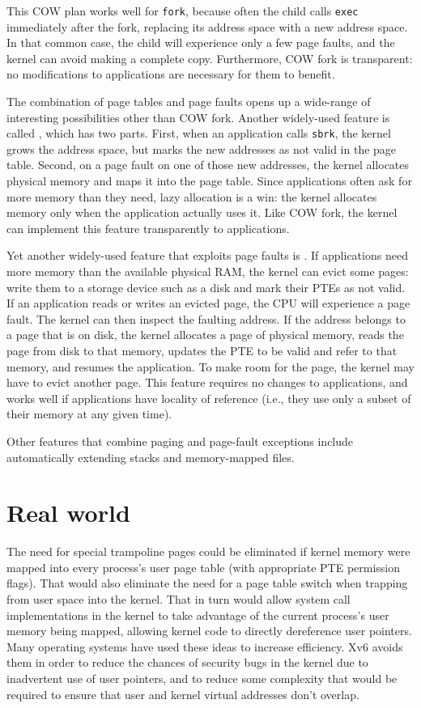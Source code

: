 This COW plan works well for \lstinline{fork}, because often the child
calls \lstinline{exec} immediately after the fork, replacing its
address space with a new address space.  In that common case, the
child will experience only a few page faults, and the kernel can avoid making
a complete copy.  Furthermore, COW fork is transparent:
no modifications to applications are necessary for
them to benefit.

The combination of page tables and page faults opens up a wide-range
of interesting possibilities other than COW fork.  Another widely-used
feature is called , which has two parts.
First, when an application calls \lstinline{sbrk}, the kernel grows
the address space, but marks the new addresses as not valid in the
page table. Second, on a page fault on one of those new addresses,
the kernel allocates physical
memory and maps it into the page table.  Since applications often ask
for more memory than they need, lazy allocation is a win: the kernel
allocates memory only when the application actually uses it.  Like
COW fork, the kernel can implement this feature transparently to
applications.

Yet another widely-used feature that exploits page faults
is .  If applications need more
memory than the available physical RAM,
the kernel can evict some pages: write
them to a storage device such as a disk and mark their
PTEs as not valid. If an application reads
or writes an
evicted page, the CPU will experience a page fault. The kernel can
then inspect the faulting address. If the address belongs to a page
that is on disk, the kernel allocates a page of physical
memory,
reads the page from disk to that memory, updates
the PTE to be valid and refer to that memory,
and resumes the application. To make room for the page,
the kernel may have to evict another page.  This feature requires no
changes to applications, and works well if applications have locality
of reference (i.e., they use only a subset of their memory
at any given time).

Other features that combine paging and page-fault exceptions include
automatically extending stacks and memory-mapped files.

\section{Real world}

The need for special trampoline pages could be eliminated if kernel
memory were mapped into every process's user page table (with
appropriate PTE permission flags). That would
also eliminate the need for a page table switch when trapping from
user space into the kernel. That in turn would allow system call
implementations in the kernel to take advantage of the current
process's user memory being mapped, allowing kernel code to directly
dereference user pointers. Many operating systems have used these ideas to
increase efficiency. Xv6 avoids them in order to reduce the chances of
security bugs in the kernel due to inadvertent use of user pointers,
and to reduce some complexity that would be required to ensure that
user and kernel virtual addresses don't overlap.

